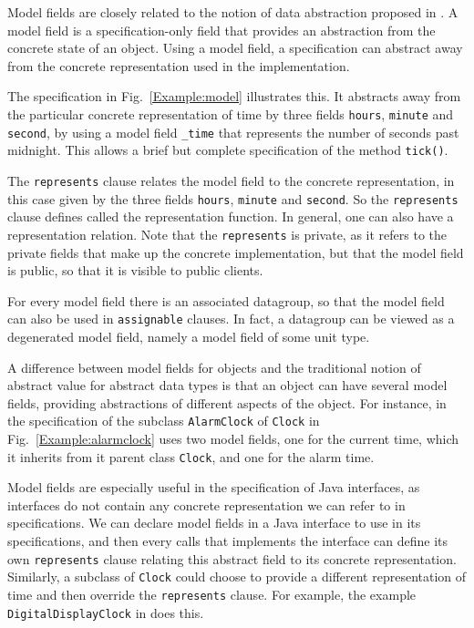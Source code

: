 \documentclass{llncs}
\begin{document}

Model fields are closely related to the notion of data abstraction proposed in 
\cite{Hoare72}.  A model field is a specification-only field that provides an 
abstraction from the concrete state of an object.  Using a model field, a 
specification can abstract away from the concrete representation used in 
the implementation.

The specification in Fig.~\ref{Example:model} illustrates this.
It abstracts away from the particular concrete representation of time
by three fields \texttt{hours}, \texttt{minute} and \texttt{second},
by using a model field \texttt{\_time} that represents the number of seconds
past midnight.
This allows a brief but complete specification of the method \texttt{tick()}.

The \texttt{represents} clause relates the model field to the concrete representation,
in this case given by the three fields  \texttt{hours}, \texttt{minute} and 
\texttt{second}. So the \texttt{represents} clause defines called the 
representation function. In general, one can also have a representation relation.
Note that the \texttt{represents} is private, as it refers to the private
fields that make up the concrete implementation, but that the model field
is public, so that it is visible to public clients.

For every model field there is an associated datagroup, so that the 
model field can also be used in \texttt{assignable} clauses.
In fact, a datagroup can be viewed as a degenerated model field, namely
a model field of some unit type.

A difference between model fields for objects and the traditional notion of
abstract value for abstract data types is that an object can have several
model fields, providing abstractions of different aspects of the object.
For instance, in the specification of the subclass \texttt{AlarmClock}
of \texttt{Clock} in Fig.~\ref{Example:alarmclock} uses 
two model fields, one for the current time, which it inherits from
it parent class \texttt{Clock}, and one for the alarm time.

Model fields are especially useful in the specification of Java interfaces,
as interfaces do not contain any concrete representation we can refer
to in specifications. We can declare model fields in a Java interface
to use in its specifications, and then every calls that implements 
the interface can define its own \texttt{represents} clause relating
this abstract field to its concrete representation. Similarly, a subclass
of \texttt{Clock} could choose to provide a different representation
of time and then override the \texttt{represents} clause. For example,
the example \texttt{DigitalDisplayClock} in 
does this.
\end{document}
